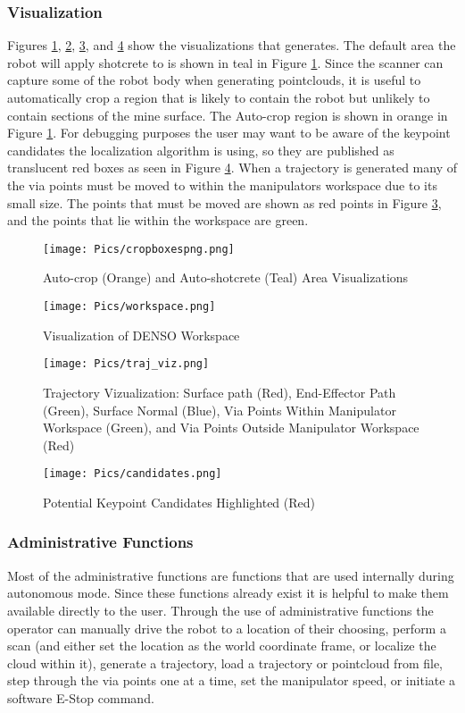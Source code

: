 \subsubsection{Visualization}
Figures \ref{fig:cropb}, \ref{fig:worksp}, \ref{fig:trajviz}, and \ref{fig:cands} show the visualizations that  generates. The default area the robot will apply shotcrete to is shown in teal in Figure \ref{fig:cropb}. Since the scanner can capture some of the robot body when generating pointclouds, it is useful to automatically crop a region that is likely to contain the robot but unlikely to contain sections of the mine surface. The Auto-crop region is shown in orange in Figure \ref{fig:cropb}. For debugging purposes the user may want to be aware of the keypoint candidates the localization algorithm is using, so they are published as translucent red boxes as seen in Figure \ref{fig:cands}. When a trajectory is generated many of the via points must be moved to within the manipulators workspace due to its small size. The points that must be moved are shown as red points in Figure \ref{fig:trajviz}, and the points that lie within the workspace are green.\\
\begin{figure}[h]
    \centering
    \texttt{[image: Pics/cropboxespng.png]}
    \caption{Auto-crop (Orange) and Auto-shotcrete (Teal) Area Visualizations}
    \label{fig:cropb}
\end{figure}
\begin{figure}[h]
    \centering
    \texttt{[image: Pics/workspace.png]}
    \caption{Visualization of DENSO Workspace}
    \label{fig:worksp}
\end{figure}
\begin{figure}[h]
    \centering
    \texttt{[image: Pics/traj\_viz.png]}
    \caption{Trajectory Vizualization: Surface path (Red), End-Effector Path (Green), Surface Normal (Blue), Via Points Within Manipulator Workspace (Green), and Via Points Outside Manipulator Workspace (Red)}
    \label{fig:trajviz}
\end{figure}
\begin{figure}[h]
    \centering
    \texttt{[image: Pics/candidates.png]}
    \caption{Potential Keypoint Candidates Highlighted (Red)}
    \label{fig:cands}
\end{figure}
\subsubsection{Administrative Functions}
Most of the administrative functions are functions that are used internally during autonomous mode. Since these functions already exist it is helpful to make them available directly to the user. Through the use of administrative functions the operator can manually drive the robot to a location of their choosing, perform a scan (and either set the location as the world coordinate frame, or localize the cloud within it), generate a trajectory, load a trajectory or pointcloud from file, step through the via points one at a time, set the manipulator speed, or initiate a software E-Stop command. \\

